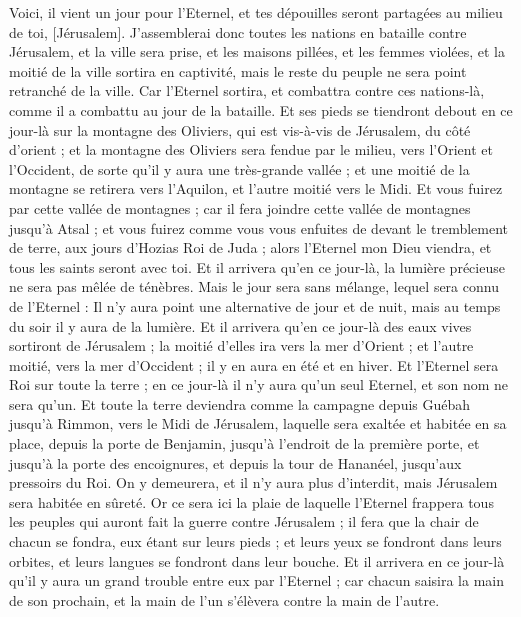 \begin{multicols}{2}
\VerseOne{}Voici, il vient un jour pour l'Eternel, et tes dépouilles seront partagées au milieu de toi, [Jérusalem].
J'assemblerai donc toutes les nations en bataille contre Jérusalem, et la ville sera prise, et les maisons pillées, et les femmes violées, et la moitié de la ville sortira en captivité, mais le reste du peuple ne sera point retranché de la ville.
Car l'Eternel sortira, et combattra contre ces nations-là, comme il a combattu au jour de la bataille.
Et ses pieds se tiendront debout en ce jour-là sur la montagne des Oliviers, qui est vis-à-vis de Jérusalem, du côté d'orient ; et la montagne des Oliviers sera fendue par le milieu, vers l'Orient et l'Occident, de sorte qu'il y aura une très-grande vallée ; et une moitié de la montagne se retirera vers l'Aquilon, et l'autre moitié vers le Midi.
Et vous fuirez par cette vallée de montagnes ; car il fera joindre cette vallée de montagnes jusqu'à Atsal ; et vous fuirez comme vous vous enfuites de devant le tremblement de terre, aux jours d'Hozias Roi de Juda ; alors l'Eternel mon Dieu viendra, et tous les saints seront avec toi.
Et il arrivera qu'en ce jour-là, la lumière précieuse ne sera pas mêlée de ténèbres.
Mais le jour sera sans mélange, lequel sera connu de l'Eternel : Il n'y aura point une alternative de jour et de nuit, mais au temps du soir il y aura de la lumière.
Et il arrivera qu'en ce jour-là des eaux vives sortiront de Jérusalem ; la moitié d'elles ira vers la mer d'Orient ; et l'autre moitié, vers la mer d'Occident ; il y en aura en été et en hiver.
Et l'Eternel sera Roi sur toute la terre ; en ce jour-là il n'y aura qu'un seul Eternel, et son nom ne sera qu'un.
Et toute la terre deviendra comme la campagne depuis Guébah jusqu'à Rimmon, vers le Midi de Jérusalem, laquelle sera exaltée et habitée en sa place, depuis la porte de Benjamin, jusqu'à l'endroit de la première porte, et jusqu'à la porte des encoignures, et depuis la tour de Hananéel, jusqu'aux pressoirs du Roi.
On y demeurera, et il n'y aura plus d'interdit, mais Jérusalem sera habitée en sûreté.
Or ce sera ici la plaie de laquelle l'Eternel frappera tous les peuples qui auront fait la guerre contre Jérusalem ; il fera que la chair de chacun se fondra, eux étant sur leurs pieds ; et leurs yeux se fondront dans leurs orbites, et leurs langues se fondront dans leur bouche.
Et il arrivera en ce jour-là qu'il y aura un grand trouble entre eux par l'Eternel ; car chacun saisira la main de son prochain, et la main de l'un s'élèvera contre la main de l'autre.

\end{multicols}
